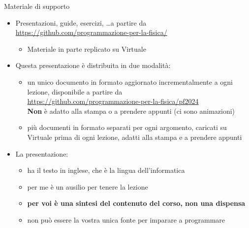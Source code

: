\begin{frame}{Materiale di supporto}

  \begin{itemize}[<+->]

  \item Presentazioni, guide, esercizi, \ldots a partire da
    \url{https://github.com/programmazione-per-la-fisica/}
    \begin{itemize}[<.->]
    \item Materiale in parte replicato su Virtuale
    \end{itemize}

  \item Questa presentazione è distribuita in due modalità:
    \begin{itemize}[<.->]
    \item un unico documento in formato  aggiornato incrementalmente a
      ogni lezione, disponibile a partire da\\
      {\smaller \url{https://github.com/programmazione-per-la-fisica/pf2024}}\\
      \textbf{Non} è adatto alla stampa o a prendere appunti (ci sono
      animazioni)
    \item più documenti in formato  separati per ogni argomento,
      caricati su Virtuale prima di ogni lezione, adatti alla stampa e a
      prendere appunti
    \end{itemize}

  \item La presentazione:
    \begin{itemize}[<.->]
    \item ha il testo in inglese, che è la lingua dell'informatica
    \item per me è un ausilio per tenere la lezione
    \item \textbf{per voi è una sintesi del contenuto del corso, non una dispensa}
    \item non può essere la vostra unica fonte per imparare a programmare
    \end{itemize}

  \end{itemize}

\end{frame}

